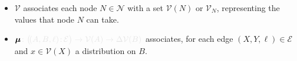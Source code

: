 \documentclass{article}
\newcommand{\notation}[2][]{#1}
\renewcommand{\notation}[2][]{{\color{notationcolor} #2}}
\newcommand{\bmu}{\boldsymbol{\mu}}
\newcommand{\V}{\mathcal V}
\newcommand{\Ed}{\mathcal E}
\newcommand{\MN}{PDG}
\numberwithin{equation}{section}
\begin{document}
\begin{notfocus}
\begin{defn}[\MN]
\begin{itemize}[nosep]
			\item $\V$ associates each node $N \in \mathcal N$ with a set $\V(N)$ or $\V_N$, representing the values that node $N$ can take.
			\item $\bmu\notation{\colon \big(\!({A,B,\ell})\colon \! \Ed \big) \to \V(A) \to \Delta\V(B)}$
			associates, for each edge $(X,Y, \ell) \in \Ed$ and $x \in \V(X)$ a distribution on $B$.

		\end{itemize}
		
	\end{defn}


\end{notfocus}
\end{document}
